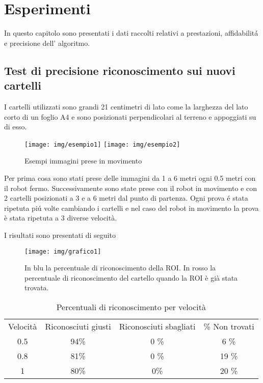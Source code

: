
\chapter{Esperimenti}
In questo capitolo sono presentati i dati raccolti relativi a prestazioni, affidabilit\'a e precisione dell' algoritmo.

\section{Test di precisione riconoscimento sui nuovi cartelli}
	
	I cartelli utilizzati sono grandi 21 centimetri di lato come la larghezza del lato corto di un foglio A4 e sono posizionati perpendicolari al terreno e appoggiati su di esso.
	\begin{figure}[!ht]
		\centering
		\texttt{[image: img/esempio1]}
		\texttt{[image: img/esempio2]}
		\caption[Esempio immagini prese]{Esempi immagini prese in movimento}
	\end{figure}
	Per prima cosa sono stati prese delle immagini da 1 a 6 metri ogni 0.5 metri con il robot fermo. Successivamente sono state prese con il robot in movimento e con 2 cartelli posizionati a 3 e a 6 metri dal punto di partenza. Ogni prova \'e stata ripetuta pi\'u volte cambiando i cartelli e nel caso del robot in movimento la prova è stata ripetuta a 3 diverse velocità.

	I risultati sono presentati di seguito

	\begin{figure}[!ht]
		\centering
		\texttt{[image: img/grafico1]}
		\caption[Grafico precisione riconoscimento]{In blu la percentuale di riconoscimento della ROI. In rosso la percentuale di riconoscimento del cartello quando la ROI è già stata trovata.}
	\end{figure}

	\begin{table}[h]
		\centering
		\begin{tabular}{cccc}
		    Velocità & Riconosciuti giusti & Riconosciuti sbagliati & \% Non trovati \\
			0.5 &   94\%    & 0 \%		& 6 \%    	\\
			0.8 &   81\%    & 0 \%		& 19 \%		\\
			1 	& 	80\%	& 0\%		& 20 \%		\\
		\end{tabular}
		\caption{Percentuali di riconoscimento per velocità}
	\end{table}

